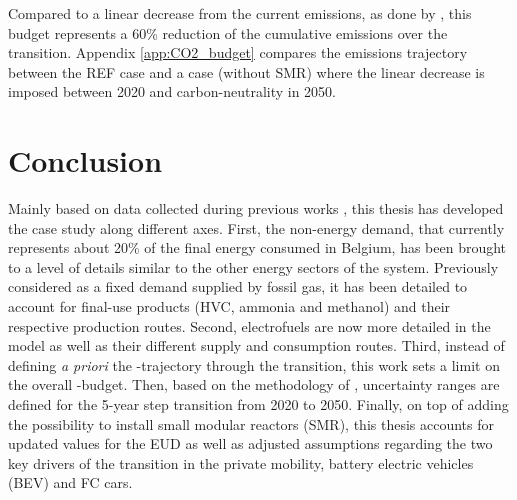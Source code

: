 Compared to a linear decrease from the current emissions, as done by \citet{limpens2024pathway}, this budget represents a 60\% reduction of the cumulative emissions over the transition.  Appendix \ref{app:CO2_budget} compares the emissions trajectory between the REF case and a case (without \gls{SMR}) where the linear decrease is imposed between 2020 and carbon-neutrality in 2050.

\section*{Conclusion}
\label{sec:cs:conclusion}
Mainly based on data collected during previous works \cite{Moret2017PhDThesis,limpens2021generating}, this thesis has developed the case study along different axes. First, the non-energy demand, that currently represents about 20\% of the final energy consumed in Belgium, has been brought to a level of details similar to the other energy sectors of the system. Previously considered as a fixed demand supplied by fossil gas, it has been detailed to account for final-use products (\ie \acrfull{HVC}, ammonia and methanol) and their respective production routes. Second, electrofuels are now more detailed in the model as well as their different supply and consumption routes. Third, instead of defining \textit{a priori} the -trajectory through the transition, this work sets a limit on the overall -budget. Then, based on the methodology of \citet{Moret2017}, uncertainty ranges are defined for the 5-year step transition from 2020 to 2050. Finally, on top of adding the possibility to install small modular reactors (SMR), this thesis accounts for updated values for the \gls{EUD} as well as adjusted assumptions regarding the two key drivers of the transition in the private mobility, \ie battery electric vehicles (BEV) and \acrfull{FC} cars.